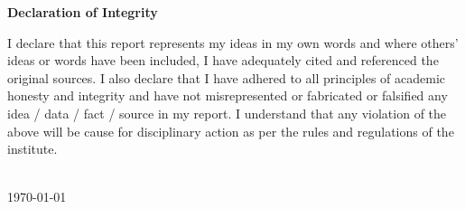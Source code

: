 \newpage
\vspace*{0.75in}
\label{pg:ack}
\begin{center} {\bf \huge Declaration of Integrity}\\[0.5in] \end{center}
{\normalsize I declare that this report represents my ideas in my own words and where others' ideas or words have 
been included, I have adequately cited and referenced the original sources. I also declare that I have adhered to 
all principles of academic honesty and integrity and have not misrepresented or fabricated or falsified any idea 
/ data / fact / source in my report. I understand that any violation of the above will be cause for disciplinary 
action as per the rules and regulations of the institute.}\\[1in]

\begin{center}
\\[0.1in]
{\raggedleft \today\\[0.1in]}
\end{center}
